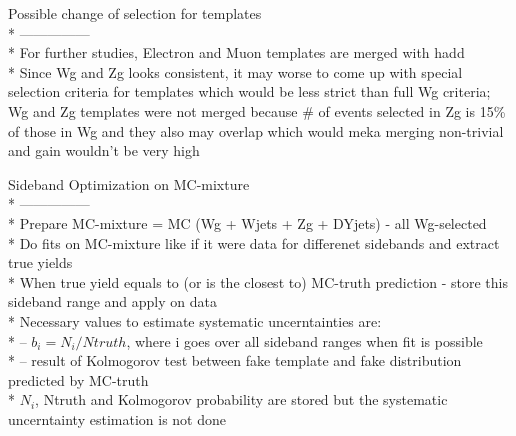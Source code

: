 \documentclass{beamer}
\begin{document}
\begin{frame}{Possible change of selection for templates}\\*
  \scriptsize 
  ---------------\\*
  For further studies, Electron and Muon templates are merged with hadd\\*
  Since Wg and Zg looks consistent, it may worse to come up with special selection criteria for templates which would be less strict than full Wg criteria; Wg and Zg templates were not merged because \# of events selected in Zg is 15\% of those in Wg and they also may overlap which would meka merging non-trivial and gain wouldn't be very high
\end{frame}


\begin{frame}{Sideband Optimization on MC-mixture}\\*
  \scriptsize 
  ---------------\\*
  Prepare MC-mixture = MC (Wg + Wjets + Zg + DYjets) - all Wg-selected\\*
  Do fits on MC-mixture like if it were data for differenet sidebands and extract true yields\\*
  When true yield equals to (or is the closest to) MC-truth prediction - store this sideband range and apply on data\\*
  Necessary values to estimate systematic uncerntainties are:\\*
  -- $b_i = N_i / Ntruth$, where i goes over all sideband ranges when fit is possible\\*
  -- result of Kolmogorov test between fake template and fake distribution predicted by MC-truth\\*
  $N_i$, Ntruth and Kolmogorov probability are stored but the systematic uncerntainty estimation is not done 
\end{frame}
\end{document}
